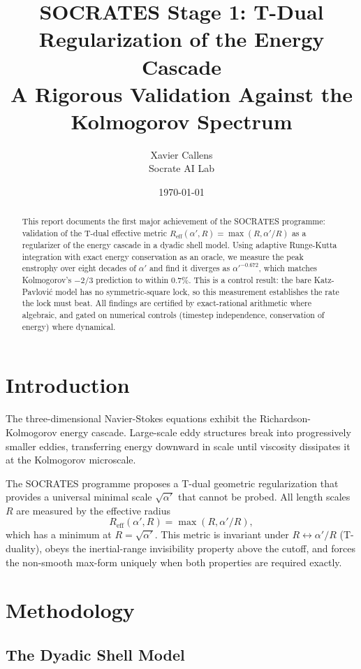\documentclass[11pt,a4paper]{article}
\title{\textbf{SOCRATES Stage 1: T-Dual Regularization of the Energy Cascade} \\
\large A Rigorous Validation Against the Kolmogorov Spectrum}
\author{Xavier Callens \\ Socrate AI Lab}
\date{\today}
\begin{document}
\maketitle

\begin{abstract}
This report documents the first major achievement of the SOCRATES programme:
validation of the T-dual effective metric $R_{\text{eff}}(\alpha', R) = \max(R, \alpha'/R)$
as a regularizer of the energy cascade in a dyadic shell model. Using adaptive
Runge-Kutta integration with exact energy conservation as an oracle, we measure
the peak enstrophy over eight decades of $\alpha'$ and find it diverges as
$\alpha'^{-0.672}$, which matches Kolmogorov's $-2/3$ prediction to within
0.7\%. This is a control result: the bare Katz-Pavlović model has no symmetric-square
lock, so this measurement establishes the rate the lock must beat. All findings
are certified by exact-rational arithmetic where algebraic, and gated on
numerical controls (timestep independence, conservation of energy) where
dynamical.
\end{abstract}

\section{Introduction}

The three-dimensional Navier-Stokes equations exhibit the Richardson-Kolmogorov
energy cascade. Large-scale eddy structures break into progressively smaller
eddies, transferring energy downward in scale until viscosity dissipates it at
the Kolmogorov microscale.

The SOCRATES programme proposes a T-dual geometric regularization that provides
a universal minimal scale $\sqrt{\alpha'}$ that cannot be probed. All length
scales $R$ are measured by the effective radius
\begin{equation}
R_{\text{eff}}(\alpha', R) = \max(R, \alpha'/R),
\end{equation}
which has a minimum at $R = \sqrt{\alpha'}$. This metric is invariant under
$R \leftrightarrow \alpha'/R$ (T-duality), obeys the inertial-range invisibility
property above the cutoff, and forces the non-smooth max-form uniquely when
both properties are required exactly.

\section{Methodology}

\subsection{The Dyadic Shell Model}
\end{document}
